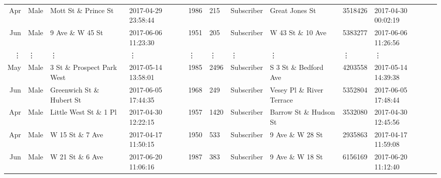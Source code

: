 \documentclass[11pt]{article}
\begin{document}
\begin{tabular}{r|llllllllll}
	 Apr                              & Male                             & Mott St \& Prince St            & 2017-04-29 23:58:44              & 1986                             &  215                             & Subscriber                       & Great Jones St                   & 3518426                          & 2017-04-30 00:02:19             \\
	 Jun                              & Male                             & 9 Ave \& W 45 St                & 2017-06-06 11:23:30              & 1951                             &  205                             & Subscriber                       & W 43 St \& 10 Ave               & 5383277                          & 2017-06-06 11:26:56             \\
	 ⋮ & ⋮ & ⋮ & ⋮ & ⋮ & ⋮ & ⋮ & ⋮ & ⋮ & ⋮\\
	 May                           & Male                          & 3 St \& Prospect Park West   & 2017-05-14 13:58:01           & 1985                          & 2496                          & Subscriber                    & S 3 St \& Bedford Ave        & 4203558                       & 2017-05-14 14:39:38          \\
	 Jun                           & Male                          & Greenwich St \& Hubert St    & 2017-06-05 17:44:35           & 1968                          &  249                          & Subscriber                    & Vesey Pl \& River Terrace    & 5352804                       & 2017-06-05 17:48:44          \\
	 Apr                           & Male                          & Little West St \& 1 Pl       & 2017-04-30 12:22:15           & 1957                          & 1420                          & Subscriber                    & Barrow St \& Hudson St       & 3532080                       & 2017-04-30 12:45:56          \\
	 Apr                           & Male                          & W 15 St \& 7 Ave             & 2017-04-17 11:50:15           & 1950                          &  533                          & Subscriber                    & 9 Ave \& W 28 St             & 2935863                       & 2017-04-17 11:59:08          \\
	 Jun                           & Male                          & W 21 St \& 6 Ave             & 2017-06-20 11:06:16           & 1987                          &  383                          & Subscriber                    & 9 Ave \& W 18 St             & 6156169                       & 2017-06-20 11:12:40          \\

\end{tabular}
\end{document}
